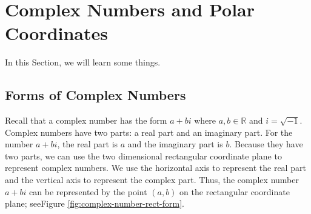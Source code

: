 
\section{Complex Numbers and Polar Coordinates} \label{supplement-complex-numbers-and-polar-coordinates}
In this Section, we will learn some things.

\subsection*{Forms of Complex Numbers}
      
        Recall that a complex number has the form $a+bi$ where $a,b \in \mathbb{R}$ and $i=\sqrt{-1}$. Complex numbers have two parts: a real part and an imaginary part. For the number $a+bi$, the real part is $a$ and the imaginary part is $b$. Because they have two parts, we can use the two dimensional rectangular coordinate plane to represent complex numbers. We use the horizontal axis to represent the real part and the vertical axis to represent the complex part. Thus, the complex number $a+bi$ can be represented by the point $ \left( a,b \right)$ on the rectangular coordinate plane; seeFigure \ref{fig:complex-number-rect-form}.
      
      \begin{center}
     \label{fig:complex-number-rect-form}
      \captionsetup{type=figure} 
        
          
          
        
      \end{center}

